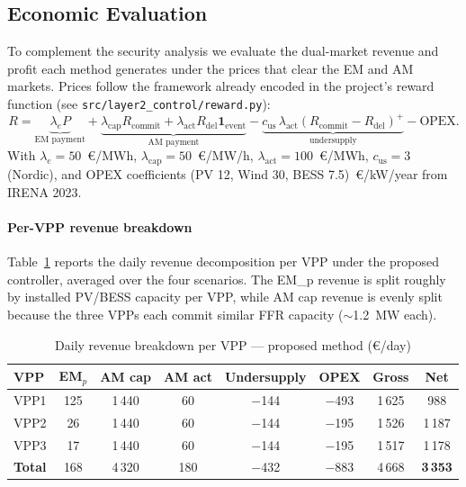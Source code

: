 \subsection{Economic Evaluation}
\label{ssec:economic}

To complement the security analysis we evaluate the dual-market revenue and
profit each method generates under the prices that clear the EM and AM
markets. Prices follow the framework already encoded in the project's reward
function (see \texttt{src/layer2\_control/reward.py}):
\[
R = \underbrace{\lambda_e P}_{\text{EM payment}}
  + \underbrace{\lambda_{\text{cap}} R_{\text{commit}}
              + \lambda_{\text{act}} R_{\text{del}} \mathbf{1}_{\text{event}}}_{\text{AM payment}}
  - \underbrace{c_{\text{us}}\,\lambda_{\text{act}} (R_{\text{commit}}-R_{\text{del}})^{+}}_{\text{undersupply}}
  - \text{OPEX}.
\]
With $\lambda_e=50$~\euro/MWh,
$\lambda_{\text{cap}}=50$~\euro/MW/h, $\lambda_{\text{act}}=100$~\euro/MWh,
$c_{\text{us}}=3$ (Nordic), and OPEX coefficients (PV 12, Wind 30,
BESS 7.5)~\euro/kW/year from IRENA 2023.

\paragraph{Per-VPP revenue breakdown}
Table~\ref{tab:revenue_breakdown} reports the daily revenue decomposition per
VPP under the proposed controller, averaged over the four scenarios. The
EM\_p revenue is split roughly by installed PV/BESS capacity per VPP,
while AM cap revenue is evenly split because the three VPPs each commit
similar FFR capacity ($\sim$1.2~MW each).

\begin{table}[!t]
\caption{Daily revenue breakdown per VPP --- proposed method (\euro/day)}
\label{tab:revenue_breakdown}
\centering
\footnotesize
\begin{tabular}{lccccccc}
\toprule
VPP & EM$_p$ & AM cap & AM act & Undersupply & OPEX & Gross & Net \\
\midrule
VPP1 & 125 & 1\,440 &  60 & $-$144 & $-$493 & 1\,625 & 988  \\
VPP2 &  26 & 1\,440 &  60 & $-$144 & $-$195 & 1\,526 & 1\,187 \\
VPP3 &  17 & 1\,440 &  60 & $-$144 & $-$195 & 1\,517 & 1\,178 \\
\midrule
\textbf{Total} & 168 & 4\,320 & 180 & $-$432 & $-$883 & 4\,668 & \textbf{3\,353} \\
\bottomrule
\end{tabular}
\end{table}

